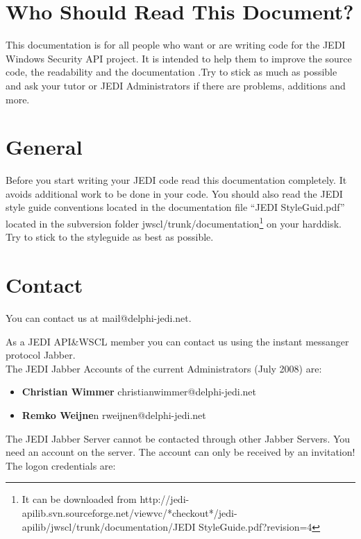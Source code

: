 \documentclass[a4paper,oneside,10pt]{article}
\begin{document}


\section{Who Should Read This Document?}
This documentation is for all people who want or are writing code for the JEDI Windows Security API project. It is intended to help them to improve the source code, the readability and the documentation .Try to stick as much as possible and ask your tutor or JEDI Administrators if there are problems, additions and more.

\section{General}

Before you start writing your JEDI code read this documentation completely. It avoids additional work to be done in your code. You should also read the JEDI style guide conventions located in the documentation file "`JEDI StyleGuid.pdf"' located in the subversion folder jwscl/trunk/documentation\footnote{It can be downloaded from http://jedi-apilib.svn.sourceforge.net/viewvc/*checkout*/jedi-apilib/jwscl/trunk/documentation/JEDI StyleGuide.pdf?revision=4} on your harddisk. Try to stick to the styleguide as best as possible.

\section{Contact}

You can contact us at mail@delphi-jedi.net.

As a JEDI API\&WSCL member you can contact us using the instant messanger protocol Jabber.\\
The JEDI Jabber Accounts of the current Administrators (July 2008) are:
\begin{itemize}
	\item \textbf{Christian Wimmer} christianwimmer@delphi-jedi.net
	\item \textbf{Remko Weijne}n rweijnen@delphi-jedi.net
\end{itemize}

The JEDI Jabber Server cannot be contacted through other Jabber Servers. You need an account on the server. The account can only be received by an invitation!\\
The logon credentials are: \\
\end{document}
